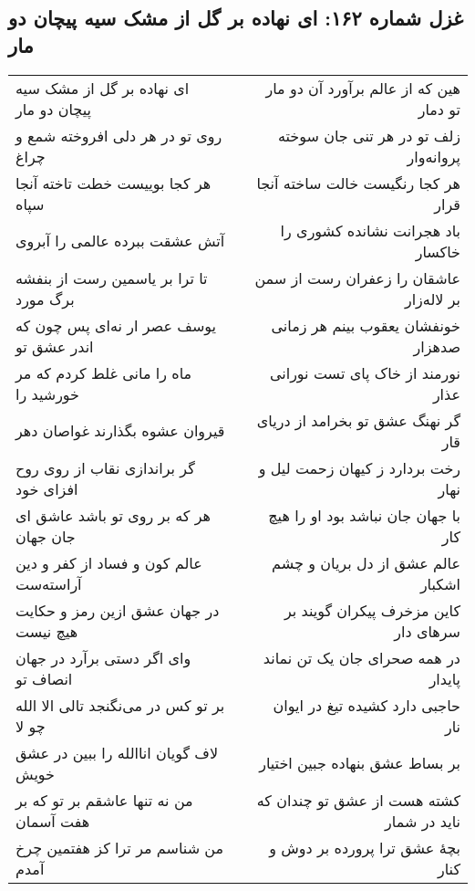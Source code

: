 \begin{center}
\section*{غزل شماره ۱۶۲: ای نهاده بر گل از مشک سیه پیچان دو مار}
\label{sec:162}
\begin{longtable}{l p{0.5cm} r}
ای نهاده بر گل از مشک سیه پیچان دو مار
&&
هین که از عالم برآورد آن دو مار تو دمار
\\
روی تو در هر دلی افروخته شمع و چراغ
&&
زلف تو در هر تنی جان سوخته پروانه‌وار
\\
هر کجا بوییست خطت تاخته آنجا سپاه
&&
هر کجا رنگیست خالت ساخته آنجا قرار
\\
آتش عشقت ببرده عالمی را آبروی
&&
باد هجرانت نشانده کشوری را خاکسار
\\
تا ترا بر یاسمین رست از بنفشه برگ مورد
&&
عاشقان را زعفران رست از سمن بر لاله‌زار
\\
یوسف عصر ار نه‌ای پس چون که اندر عشق تو
&&
خونفشان یعقوب بینم هر زمانی صدهزار
\\
ماه را مانی غلط کردم که مر خورشید را
&&
نورمند از خاک پای تست نورانی عذار
\\
قیروان عشوه بگذارند غواصان دهر
&&
گر نهنگ عشق تو بخرامد از دریای قار
\\
گر براندازی نقاب از روی روح افزای خود
&&
رخت بردارد ز کیهان زحمت لیل و نهار
\\
هر که بر روی تو باشد عاشق ای جان جهان
&&
با جهان جان نباشد بود او را هیچ کار
\\
عالم کون و فساد از کفر و دین آراسته‌ست
&&
عالم عشق از دل بریان و چشم اشکبار
\\
در جهان عشق ازین رمز و حکایت هیچ نیست
&&
کاین مزخرف پیکران گویند بر سرهای دار
\\
وای اگر دستی برآرد در جهان انصاف تو
&&
در همه صحرای جان یک تن نماند پایدار
\\
بر تو کس در می‌نگنجد تالی الا الله چو لا
&&
حاجبی دارد کشیده تیغ در ایوان نار
\\
لاف گویان اناالله را ببین در عشق خویش
&&
بر بساط عشق بنهاده جبین اختیار
\\
من نه تنها عاشقم بر تو که بر هفت آسمان
&&
کشته هست از عشق تو چندان که ناید در شمار
\\
من شناسم مر ترا کز هفتمین چرخ آمدم
&&
بچهٔ عشق ترا پرورده بر دوش و کنار
\\
\end{longtable}
\end{center}
